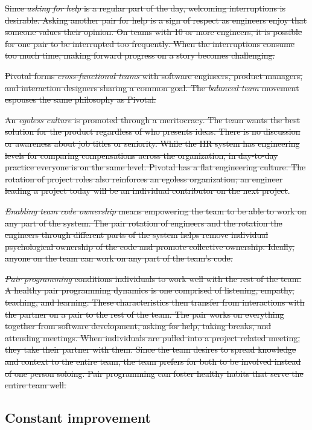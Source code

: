 \sout{Since \textit{asking for help} is a regular part of the day, welcoming interruptions is desirable. Asking another pair for help is a sign of respect as engineers enjoy that someone values their opinion. On teams with 10 or more engineers, it is possible for one pair to be interrupted too frequently. When the interruptions consume too much time, making forward progress on a story becomes challenging. }


\sout{Pivotal forms \textit{cross-functional teams} with software engineers, product managers, and interaction designers sharing a common goal. The \textit{balanced team} movement espouses the same philosophy as Pivotal. }


\sout{An \textit{egoless culture} is promoted through a meritocracy. The team wants the best solution for the product regardless of who presents ideas. There is no discussion or awareness about job titles or seniority. While the HR system has engineering levels for comparing compensations across the organization, in day-to-day practice everyone is on the same level. Pivotal has a flat engineering culture. The rotation of project roles also reinforces an egoless organization; an engineer leading a project today will be an individual contributor on the next project}. 


\sout{\textit{Enabling team code ownership} means empowering the team to be able to work on any part of the system. The pair rotation of engineers and the rotation the engineers through different parts of the system helps remove individual psychological ownership of the code and promote collective ownership. Ideally, anyone on the team can work on any part of the team's code.}


\sout{\textit{Pair programming} conditions individuals to work well with the rest of the team. A healthy pair programming dynamics is one comprised of listening, empathy, teaching, and learning. These characteristics then transfer from interactions with the partner on a pair to the rest of the team. The pair works on everything together from software development, asking for help, taking breaks, and attending meetings. When individuals are pulled into a project related meeting, they take their partner with them. Since the team desires to spread knowledge and context to the entire team, the team prefers for both to be involved instead of one person soloing. Pair programming can foster healthy habits that serve the entire team well.}


\subsection{Constant improvement}


